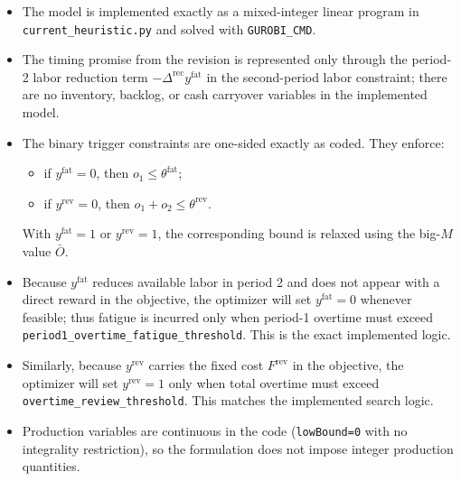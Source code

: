 \begin{itemize}
    \item The model is implemented exactly as a mixed-integer linear program in \texttt{current\_heuristic.py} and solved with \texttt{GUROBI\_CMD}.
    \item The timing promise from the revision is represented only through the period-2 labor reduction term
    $
    -\Delta^{\text{rec}} y^{\text{fat}}
    $
    in the second-period labor constraint; there are no inventory, backlog, or cash carryover variables in the implemented model.
    \item The binary trigger constraints are one-sided exactly as coded. They enforce:
    \begin{itemize}
        \item if $y^{\text{fat}}=0$, then $o_1 \le \theta^{\text{fat}}$;
        \item if $y^{\text{rev}}=0$, then $o_1+o_2 \le \theta^{\text{rev}}$.
    \end{itemize}
    With $y^{\text{fat}}=1$ or $y^{\text{rev}}=1$, the corresponding bound is relaxed using the big-$M$ value $\bar O$.
    \item Because $y^{\text{fat}}$ reduces available labor in period 2 and does not appear with a direct reward in the objective, the optimizer will set $y^{\text{fat}}=0$ whenever feasible; thus fatigue is incurred only when period-1 overtime must exceed \texttt{period1\_overtime\_fatigue\_threshold}. This is the exact implemented logic.
    \item Similarly, because $y^{\text{rev}}$ carries the fixed cost $F^{\text{rev}}$ in the objective, the optimizer will set $y^{\text{rev}}=1$ only when total overtime must exceed \texttt{overtime\_review\_threshold}. This matches the implemented search logic.
    \item Production variables are continuous in the code (\texttt{lowBound=0} with no integrality restriction), so the formulation does not impose integer production quantities.
\end{itemize}
